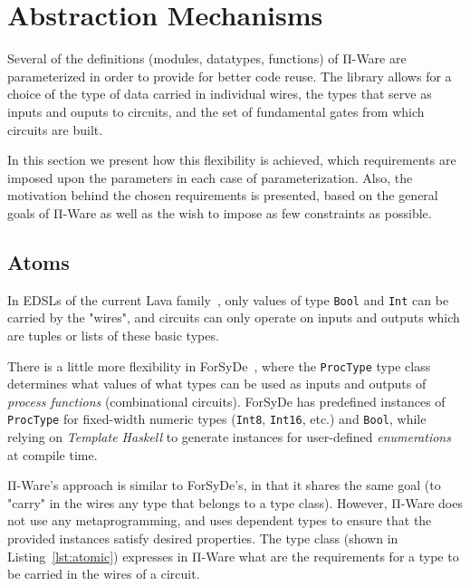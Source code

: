     \section{Abstraction Mechanisms}
    \label{sec:circuit-abstraction}
        Several of the definitions (modules, datatypes, functions) of Π-Ware are parameterized
        in order to provide for better code reuse.
        The library allows for a choice of the type of data carried in individual wires,
        the types that serve as inputs and ouputs to circuits,
        and the set of fundamental gates from which circuits are built.

        In this section we present how this flexibility is achieved,
        which requirements are imposed upon the parameters in each case of parameterization.
        Also, the motivation behind the chosen requirements is presented,
        based on the general goals of Π-Ware as well as the wish to impose as few constraints as possible.


        \subsection{Atoms}
        \label{subsec:atoms}
            In \acp{EDSL} of the current Lava family~\cite{observable-sharing-circuits},
            only values of type \texttt{Bool} and \texttt{Int}
            can be carried by the "wires", and circuits can only operate on inputs and outputs
            which are tuples or lists of these basic types.

            There is a little more flexibility in ForSyDe~\cite{forsyde1999},
            where the \texttt{ProcType} type class determines what values of what types
            can be used as inputs and outputs of \emph{process functions} (combinational circuits).
            ForSyDe has predefined instances of \texttt{ProcType} for fixed-width numeric types
            (\texttt{Int8}, \texttt{Int16}, etc.) and \texttt{Bool},
            while relying on \emph{Template Haskell} to generate instances for user-defined \emph{enumerations}
            at compile time.

            Π-Ware's approach is similar to ForSyDe's, in that it shares the same goal
            (to "carry" in the wires any type that belongs to a type class).
            However, Π-Ware does not use any metaprogramming, and uses dependent types
            to ensure that the provided instances satisfy desired properties.
            The type class  (shown in Listing~\ref{lst:atomic})
            expresses in Π-Ware what are the requirements for a type to be carried in the wires of a circuit.

